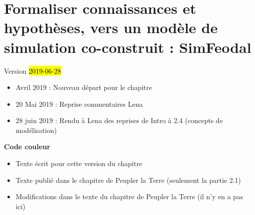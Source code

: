 \chapter{Formaliser connaissances et hypothèses, vers un modèle de simulation co-construit : SimFeodal}
\label{chap:chap2}
\begin{center}
	{\large Version \hl{2019-06-28}}
\end{center}

\begin{itemize}
	\item Avril 2019 : Nouveau départ pour le chapitre
	\item 20 Mai 2019 : Reprise commentaires Lena
	\item 28 juin 2019 : Rendu à Lena des reprises de Intro à 2.4 (concepts de modélisation)
\end{itemize}
\setcounter{minitocdepth}{1}

	\minitoc


\textbf{Code couleur}
\begin{itemize}
	\item Texte écrit pour cette version du chapitre
	\item {\redroman Texte publié dans le chapitre de Peupler la Terre} (seulement la partie 2.1)
	\item {\blueroman Modifications dans le texte du chapitre de Peupler la Terre} (il n'y en a pas ici)
\end{itemize}

\clearpage

